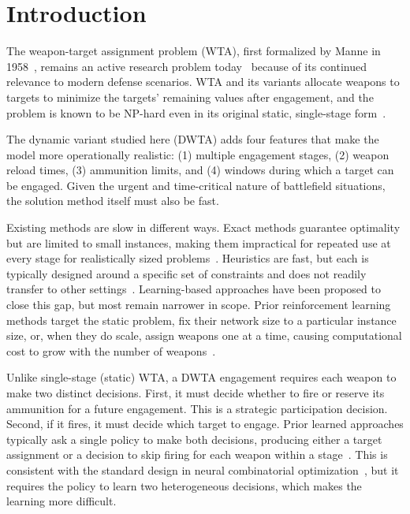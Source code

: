 \section{Introduction}
\label{sec:introduction}

The weapon-target assignment problem (WTA), first formalized by Manne in
1958~\cite{manne1958target}, remains an active research problem
today~\cite{ahuja2007exact} because of its continued relevance to modern
defense scenarios. WTA and its variants allocate weapons to targets to
minimize the targets' remaining values after engagement, and the problem is
known to be NP-hard even in its original static, single-stage
form~\cite{lloyd1986weapons}.

The dynamic variant studied here (DWTA) adds four features that make the
model more operationally realistic: (1) multiple engagement stages, (2)
weapon reload times, (3) ammunition limits, and (4) windows during which a
target can be engaged. Given the urgent and time-critical nature of
battlefield situations, the solution method itself must also be fast.

Existing methods are slow in different ways. Exact methods guarantee
optimality but are limited to small instances, making them impractical for
repeated use at every stage for realistically sized
problems~\cite{ahuja2007exact,kline2019weapon}. Heuristics are fast, but each
is typically designed around a specific set of constraints and does not
readily transfer to other settings~\cite{kolitz1988analysis,lee2003genetic}.
Learning-based approaches have been proposed to close this gap, but most
remain narrower in scope. Prior reinforcement learning methods target the
static problem, fix their network size to a particular instance size, or,
when they do scale, assign weapons one at a time, causing computational cost
to grow with the number of
weapons~\cite{na2023weapon,gaudet2023,wu2022dynamic,yoontransformer}.

Unlike single-stage (static) WTA, a DWTA engagement requires each weapon to
make two distinct decisions. First, it must decide whether to fire or reserve
its ammunition for a future engagement. This is a strategic participation
decision. Second, if it fires, it must decide which target to engage. Prior
learned approaches typically ask a single policy to make both decisions,
producing either a target assignment or a decision to skip firing for each
weapon within a stage~\cite{na2023weapon,gaudet2023,yoontransformer}. This is
consistent with the standard design in neural combinatorial
optimization~\cite{kool2018attention,kwon2020pomo}, but it requires the
policy to learn two heterogeneous decisions, which makes the learning
more difficult.

